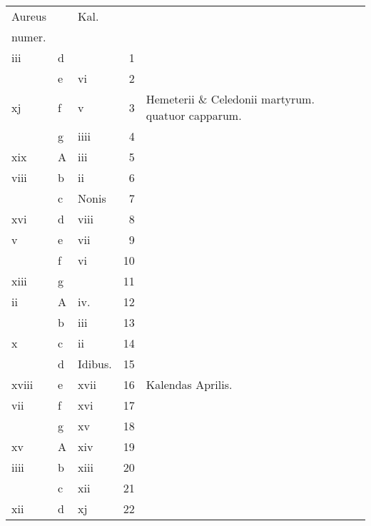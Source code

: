 \documentclass[11pt,openany]{book}
\begin{document}
\begin{center}
\begin{tabular}{l | l | l | r | l r}
\color{Red}Aureus & & \color{Red} Kal. & & \color{Red} \\
\color{Red}numer. & & & & \color{Red} \\
\color{Red} iii & d & & 1 & & \color{Red} \\
\color{Red}  & e & \color{Red} vi & 2 & & \color{Red} \\
\color{Red} xj & f & \color{Red} v & 3 & Hemeterii \& Celedonii martyrum. \color{Red} quatuor capparum. & \color{Red} \\
\color{Red}  & g & \color{Red} iiii & 4 & & \color{Red} \\
\color{Red} xix & \color{Red} A & \color{Red} iii & 5 & & \color{Red} \\
\color{Red} viii & b & \color{Red} ii & 6 & & \color{Red} \\
\color{Red}  & c & Nonis & 7 & & \color{Red} \\
\color{Red} xvi & d & \color{Red} viii & 8 & & \color{Red} \\
\color{Red} v & e & \color{Red} vii & 9 & & \color{Red} \\
\color{Red}  & f & \color{Red} vi & 10 & & \color{Red} \\
\color{Red} xiii & g & & 11 & & \color{Red} \\%
\color{Red} ii & \color{Red} A & \color{Red} iv. & 12 & & \color{Red} \\
\color{Red}  & b & \color{Red} iii & 13 & & \color{Red} \\
\color{Red} x & c & \color{Red} ii & 14 & & \color{Red} \\
\color{Red}  & d & Idibus. & 15 & & \color{Red} \\
\color{Red} xviii & e & \color{Red} xvii & 16 & \qquad \color{Red} Kalendas Aprilis. & \color{Red} \\
\color{Red} vii & f & \color{Red} xvi & 17 & & \color{Red} \\
\color{Red}  & g & \color{Red} xv & 18 & & \color{Red} \\
\color{Red} xv & \color{Red} A & \color{Red} xiv & 19 & & \color{Red} \\
\color{Red} iiii & b & \color{Red} xiii & 20 & & \color{Red} \\
\color{Red}  & c & \color{Red} xii & 21 & & \color{Red} \\
\color{Red} xii & d & \color{Red} xj & 22 & & \color{Red} \\

\end{tabular}
\end{center}
\end{document}

